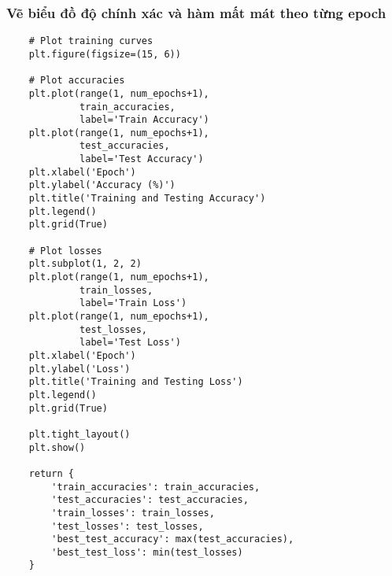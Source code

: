 \documentclass[../main.tex]{subfiles}
\begin{document}
\subsubsection*{Vẽ biểu đồ độ chính xác và hàm mất mát theo từng epoch}

\begin{verbatim}
    # Plot training curves
    plt.figure(figsize=(15, 6))
    
    # Plot accuracies
    plt.plot(range(1, num_epochs+1), 
             train_accuracies, 
             label='Train Accuracy')
    plt.plot(range(1, num_epochs+1), 
             test_accuracies, 
             label='Test Accuracy')
    plt.xlabel('Epoch')
    plt.ylabel('Accuracy (%)')
    plt.title('Training and Testing Accuracy')
    plt.legend()
    plt.grid(True)
    
    # Plot losses
    plt.subplot(1, 2, 2)
    plt.plot(range(1, num_epochs+1), 
             train_losses, 
             label='Train Loss')
    plt.plot(range(1, num_epochs+1), 
             test_losses, 
             label='Test Loss')
    plt.xlabel('Epoch')
    plt.ylabel('Loss')
    plt.title('Training and Testing Loss')
    plt.legend()
    plt.grid(True)
    
    plt.tight_layout()
    plt.show()
    
    return {
        'train_accuracies': train_accuracies,
        'test_accuracies': test_accuracies,
        'train_losses': train_losses,
        'test_losses': test_losses,
        'best_test_accuracy': max(test_accuracies),
        'best_test_loss': min(test_losses)
    }
\end{verbatim}
\end{document}
